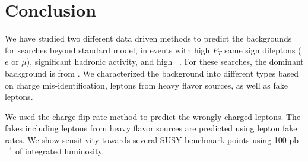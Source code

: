 \section{Conclusion}
\label{sec:conclusion}
We have studied two different data driven methods to predict the backgrounds for  
searches beyond standard model, in events with high $P_T$ same sign dileptons
($e$ or $\mu$), significant hadronic activity, and high \met~. 
For these searches, the dominant background is from \ttbar. We characterized
the background into different types based on charge mis-identification,
leptons from heavy flavor sources, as well as fake leptons.

We used the charge-flip rate method to predict the wrongly charged 
leptons. The fakes including leptons from heavy flavor sources are predicted 
using lepton fake rates. We show sensitivity towards several SUSY benchmark 
points using 100 pb$^{-1}$ of integrated luminosity.


